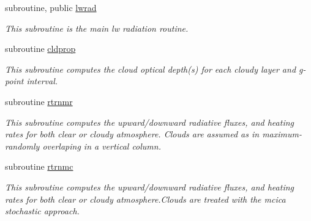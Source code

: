 {\bf }\par
\begin{DoxyCompactItemize}
\item 
subroutine, public \hyperlink{group__module__radlw__main_gacff9ff756859e9abcd3905c7725fdff3}{lwrad}
\begin{DoxyCompactList}\small\item\em This subroutine is the main lw radiation routine. \end{DoxyCompactList}\end{DoxyCompactItemize}

{\bf }\par
\begin{DoxyCompactItemize}
\item 
subroutine \hyperlink{group__module__radlw__main_ga735598d1b11b0a090d142977a8f64f89}{cldprop}
\begin{DoxyCompactList}\small\item\em This subroutine computes the cloud optical depth(s) for each cloudy layer and g-\/point interval. \end{DoxyCompactList}\end{DoxyCompactItemize}

{\bf }\par
\begin{DoxyCompactItemize}
\item 
subroutine \hyperlink{group__module__radlw__main_gab0d2454aa5b29643b52fa31abe2f97b0}{rtrnmr}
\begin{DoxyCompactList}\small\item\em This subroutine computes the upward/downward radiative fluxes, and heating rates for both clear or cloudy atmosphere. Clouds are assumed as in maximum-\/randomly overlaping in a vertical column. \end{DoxyCompactList}\end{DoxyCompactItemize}

{\bf }\par
\begin{DoxyCompactItemize}
\item 
subroutine \hyperlink{group__module__radlw__main_gaf0e13eadc5dad88e144734d2c6b9fd0f}{rtrnmc}
\begin{DoxyCompactList}\small\item\em This subroutine computes the upward/downward radiative fluxes, and heating rates for both clear or cloudy atmosphere.\+Clouds are treated with the mcica stochastic approach. \end{DoxyCompactList}\end{DoxyCompactItemize}

